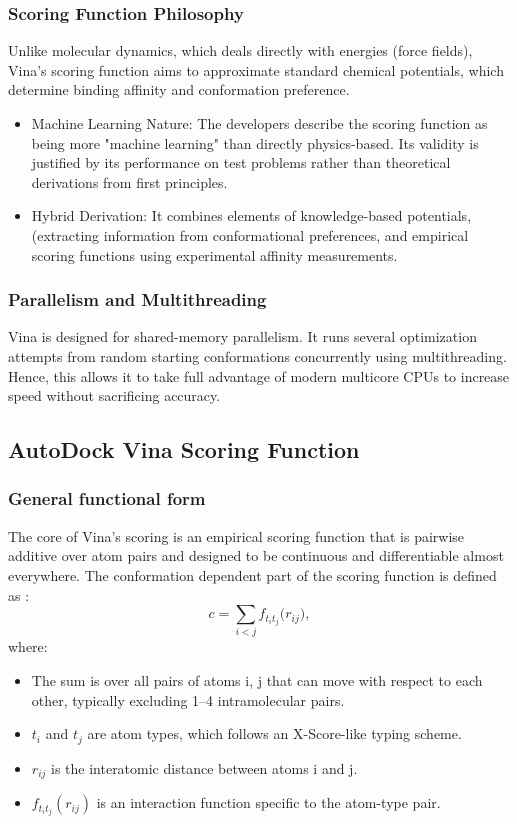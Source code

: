 \documentclass[12pt, a4paper]{article}
\begin{document}
\subsubsection{Scoring Function Philosophy}
Unlike molecular dynamics, which deals directly with energies (force fields), Vina’s scoring function aims to approximate standard chemical potentials, which determine binding affinity and conformation preference.
\begin{itemize}
\item Machine Learning Nature: The developers describe the scoring function as being more "machine learning" than directly physics-based. Its validity is justified by its performance on test problems rather than theoretical derivations from first principles.
\item Hybrid Derivation: It combines elements of knowledge-based potentials, (extracting information from conformational preferences, and empirical scoring functions using experimental affinity measurements.
\end{itemize}

\subsubsection{Parallelism and Multithreading}
Vina is designed for shared-memory parallelism. It runs several optimization attempts from random starting conformations concurrently using multithreading. Hence, this allows it to take full advantage of modern multicore CPUs to increase speed without sacrificing accuracy. 

\subsection{AutoDock Vina Scoring Function}

\subsubsection{General functional form}

The core of Vina's scoring is an empirical scoring function that is pairwise additive over atom pairs and designed to be continuous and differentiable almost everywhere. The conformation dependent part of the scoring function is defined as \cite{CH7_trott2010vina}:
\[
  c = \sum_{i < j} f_{t_i t_j}\!\bigl(r_{ij}\bigr),
\]
where:
\begin{itemize}
  \item The sum is over all pairs of atoms i, j that can move with respect to each other, typically excluding 1–4 intramolecular pairs.
  \item $t_i$ and $t_j$ are atom types, which follows an X-Score-like typing scheme.
  \item $r_{ij}$ is the interatomic distance between atoms i  and j.
  \item $f_{t_i t_j}(r_{ij})$ is an interaction function specific to the atom-type pair.
\end{itemize}
\end{document}
